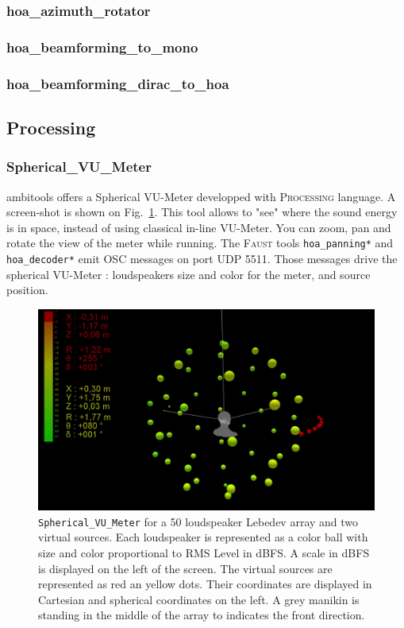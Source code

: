 \documentclass[10pt,a4paper]{article}
\begin{document}
\pagebreak
\subsubsection{hoa\_azimuth\_rotator}
\subsubsection{hoa\_beamforming\_to\_mono}
\subsubsection{hoa\_beamforming\_dirac\_to\_hoa}

\pagebreak
\subsection{Processing}
\subsubsection{Spherical\_VU\_Meter}
ambitools offers a Spherical VU-Meter developped with \textsc{Processing} language. A screen-shot is shown on Fig.~\ref{fig:spherical_vu_meter}. This tool allows to "see" where the sound energy is in space, instead of using classical in-line VU-Meter. You can zoom, pan and rotate the view of the meter while running. The \textsc{Faust} tools \lstinline'hoa_panning*' and \lstinline'hoa_decoder*' emit \textsc{OSC} messages on port UDP 5511. Those messages drive the spherical VU-Meter : loudspeakers size and color for the meter, and source position.
\begin{figure}[!ht]
\centering
\includegraphics[width=\columnwidth]{spherical_vu_meter.png}
\caption{\lstinline'Spherical_VU_Meter' for a 50 loudspeaker Lebedev array and two virtual sources. Each loudspeaker is represented as a color ball with size and color proportional to RMS Level in dBFS. A scale in dBFS is displayed on the left of the screen. The virtual sources are represented as red an yellow dots. Their coordinates are displayed in Cartesian and spherical coordinates on the left. A grey manikin is standing in the middle of the array to indicates the front direction.}
\label{fig:spherical_vu_meter}
\end{figure}
\end{document}
